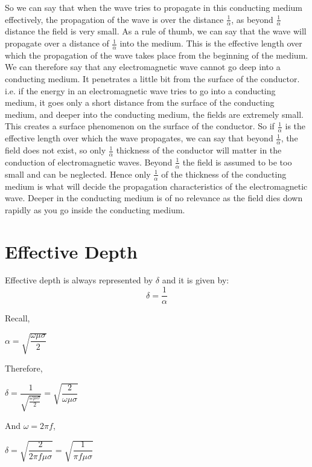So we can say that when the wave tries to propagate in this conducting medium effectively, the propagation of the wave is over the distance $\frac{1}{\alpha}$, as beyond $\frac{1}{\alpha}$ distance the field is very small. As a rule of thumb, we can say that the wave will propagate over a distance of $\frac{1}{\alpha}$ into the medium. This is the effective length over which the propagation of the wave takes place from the beginning of the medium. We can therefore say that any electromagnetic wave cannot go deep into a conducting medium. It penetrates a little bit from the surface of the conductor. i.e. if the energy in an electromagnetic wave tries to go into a conducting medium, it goes only a short distance from the surface of the conducting medium, and deeper into the conducting medium, the fields are extremely small. This creates a surface phenomenon on the surface of the conductor. So if $\frac{1}{\alpha}$  is the effective length over which the wave propagates, we can say that beyond $\frac{1}{\alpha}$, the field does not exist, so only $\frac{1}{\alpha}$ thickness of the conductor will matter in the conduction of electromagnetic waves. Beyond $\frac{1}{\alpha}$  the field is assumed to be too small and can be neglected. Hence only $\frac{1}{\alpha}$ of the thickness of the conducting medium is what will decide the propagation characteristics of the electromagnetic wave. Deeper in the conducting medium is of no relevance as the field dies down rapidly as you go inside the conducting medium.

\section{\textbf{Effective Depth}}

Effective depth is always represented by $\delta$ and it is given by:
\[
\delta=\frac{1}{\alpha}
\]

Recall,
\begin{center}
$\alpha=\sqrt{\dfrac{\omega\mu\sigma}{2}}$
\end{center}

Therefore,
\begin{center}
$\delta=\dfrac{1}{\sqrt{\frac{\omega\mu\sigma}{2}}}=\sqrt{\dfrac{2}{\omega\mu\sigma}}$
\end{center}

And $\omega=2\pi f$,
\begin{center}
$\delta=\sqrt{\dfrac{2}{2\pi f\mu\sigma}}=\sqrt{\dfrac{1}{\pi f \mu\sigma}}$	
\end{center}

